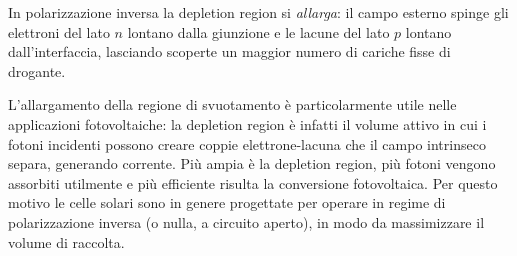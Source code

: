 In polarizzazione inversa la depletion region si \emph{allarga}: il campo esterno spinge gli elettroni del lato \( n \) lontano dalla giunzione e le lacune del lato \( p \) lontano dall'interfaccia, lasciando scoperte un maggior numero di cariche fisse di drogante.

L'allargamento della regione di svuotamento è particolarmente utile nelle applicazioni fotovoltaiche: la depletion region è infatti il volume attivo in cui i fotoni incidenti possono creare coppie elettrone-lacuna che il campo intrinseco separa, generando corrente. Più ampia è la depletion region, più fotoni vengono assorbiti utilmente e più efficiente risulta la conversione fotovoltaica. Per questo motivo le celle solari sono in genere progettate per operare in regime di polarizzazione inversa (o nulla, a circuito aperto), in modo da massimizzare il volume di raccolta.

